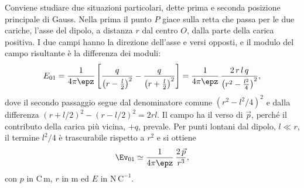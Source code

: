 \documentclass[main.tex]{subfiles}
\begin{document}
Conviene studiare due situazioni particolari, dette prima e seconda posizione principale di Gauss. Nella prima il punto $P$ giace sulla retta che passa per le due cariche, l'asse del dipolo, a distanza $r$ dal centro $O$, dalla parte della carica positiva. I due campi hanno la direzione dell'asse e versi opposti, e il modulo del campo risultante è la differenza dei moduli:
\[
E_{01}=\frac{1}{4\pi\epz}\left[\frac{q}{\left(r-\frac{l}{2}\right)^{2}}-\frac{q}{\left(r+\frac{l}{2}\right)^{2}}\right]=\frac{1}{4\pi\epz}\,\frac{2\,r\,l\,q}{\left(r^{2}-\frac{l^{2}}{4}\right)^{2}} ,
\]
dove il secondo passaggio segue dal denominatore comune $(r^2-l^2/4)^2$ e dalla differenza $(r+l/2)^2-(r-l/2)^2=2rl$. Il campo ha il verso di $\vec p$, perché il contributo della carica più vicina, $+q$, prevale. Per punti lontani dal dipolo, $l\ll r$, il termine $l^2/4$ è trascurabile rispetto a $r^2$ e si ottiene
\[
\Ev_{01}\simeq\frac{1}{4\pi\epz}\,\frac{2\,\vec{p}}{r^{3}} ,
\]
con $p$ in $\mathrm{C\,m}$, $r$ in m ed $E$ in $\mathrm{N\,C^{-1}}$.
\end{document}

